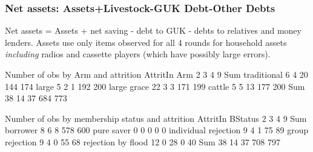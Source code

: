 
\subsubsection{Net assets: Assets+Livestock-GUK Debt-Other Debts}

Net assets = Assets + net saving - debt to GUK - debts to relatives and money lenders. Assets use only items observed for all 4 rounds for household assets \textit{including} radios and cassette players (which have possibly large errors). 


\begin{Schunk}
\begin{Soutput}


Number of obs by Arm and attrition
             AttritIn
Arm             2   3   4   9 Sum
  traditional   6   4  20 144 174
  large         5   2   1 192 200
  large grace  22   3   3 171 199
  cattle        5   5  13 177 200
  Sum          38  14  37 684 773


Number of obs by membership status and attrition
                      AttritIn
BStatus                  2   3   4   9 Sum
  borrower               8   6   8 578 600
  pure saver             0   0   0   0   0
  individual rejection   9   4   1  75  89
  group rejection        9   4   0  55  68
  rejection by flood    12   0  28   0  40
  Sum                   38  14  37 708 797
\end{Soutput}
\end{Schunk}


